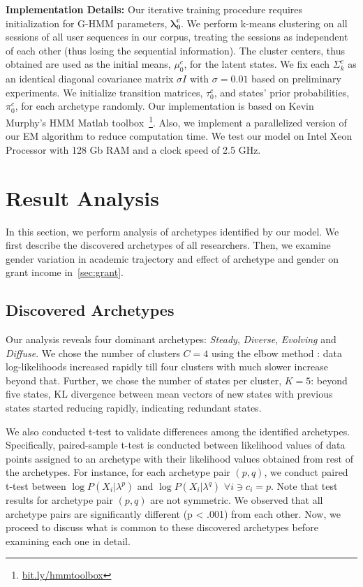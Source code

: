 \documentclass[10pt,letterpaper]{article}
\begin{document}
\textbf{Implementation Details: }
Our iterative training procedure requires initialization for G-HMM parameters, $\mathbf{\lambda^c_0}$. We perform k-means clustering on all sessions of all user sequences in our corpus, treating the sessions as independent of each other (thus losing the sequential information). The cluster centers, thus obtained are used as the initial means, $\mu^c_0$, for the latent states. We fix each $\Sigma^c_k$ as an identical diagonal covariance matrix $\sigma I$ with $\sigma = 0.01$ based on preliminary experiments. We initialize transition matrices, $\tau^c_0$, and states' prior probabilities, $\pi^c_0$, for each archetype randomly.
Our implementation is based on Kevin Murphy's HMM Matlab toolbox~\footnote{\url{bit.ly/hmmtoolbox}}. Also, we implement a parallelized version of our EM algorithm to reduce computation time. We test our model on Intel Xeon Processor with 128 Gb RAM and a clock speed of 2.5 GHz.

\section{Result Analysis}
In this section, we perform analysis of archetypes identified by our model. We first describe the discovered archetypes of all researchers. Then, we examine gender variation in academic trajectory and effect of archetype and gender on grant income in~\ref{sec:grant}.


\subsection{Discovered Archetypes}
\label{sec:acad}
Our analysis reveals four dominant archetypes: \emph{Steady}, \emph{Diverse}, \emph{Evolving} and \emph{Diffuse}. We chose the number of clusters $C=4$ using the elbow method \cite{elbow:2001}: data log-likelihoods increased rapidly till four clusters with much slower increase beyond that. Further, we chose the number of states per cluster, $K=5$: beyond five states, KL divergence\cite{kl:1951} between mean vectors of new states with previous states started reducing rapidly, indicating redundant states.

We also conducted t-test to validate differences among the identified archetypes. Specifically, paired-sample t-test \cite{goulden:1949} is conducted between likelihood values of data points assigned to an archetype with their likelihood values obtained from rest of the archetypes. For instance, for each archetype pair $(p, q)$, we conduct paired t-test between $\log P(X_i| \lambda^p)$ and $\log P(X_i| \lambda^q)$ $\forall i \ni c_i=p$. Note that test results for archetype pair $(p, q)$ are not symmetric.
We observed that all archetype pairs are significantly different (p < .001) from each other. Now, we proceed to discuss what is common to these discovered archetypes before examining each one in detail.
\end{document}
